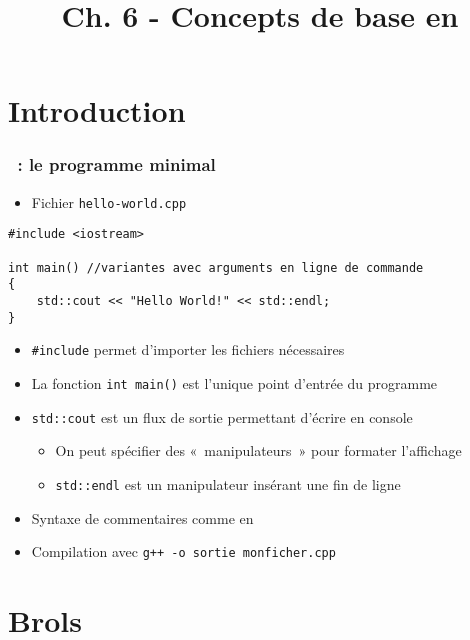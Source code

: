 


\title{Ch. 6 - Concepts de base en \cpp}




\section{Introduction}

\begin{frame}[containsverbatim]
\frametitle{\cpp\ : le programme minimal}
\begin{itemize}
\item Fichier \texttt{hello-world.cpp}
\end{itemize}
\begin{lstlisting}
#include <iostream>

int main() //variantes avec arguments en ligne de commande
{
	std::cout << "Hello World!" << std::endl;
}
\end{lstlisting}
\begin{itemize}
\item \lstinline|#include| permet d'importer les fichiers nécessaires
\item La fonction \lstinline|int main()| est l'unique point d'entrée du programme
\item \texttt{std::cout} est un flux de sortie permettant d'écrire en console
	\begin{itemize}
	\item On peut spécifier des «~manipulateurs~» pour formater l'affichage
	\item \texttt{std::endl} est un manipulateur insérant une fin de ligne
	\end{itemize}
\item Syntaxe de commentaires comme en \java
\item Compilation avec \texttt{g++ -o sortie monficher.cpp}
\end{itemize}
\end{frame}

\section{Brols}

